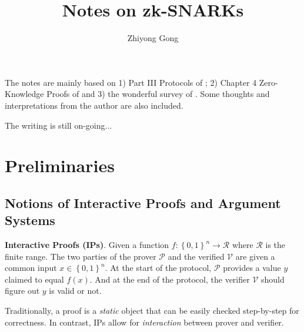 \documentclass{article}
\title{Notes on zk-SNARKs}
\author{Zhiyong Gong}
\begin{document}
\maketitle

\tableofcontents

\clearpage

The notes are mainly based on 1) Part III Protocols of \cite{boneh2020graduate}; 2) Chapter 4 Zero-Knowledge Proofs of \cite{goldreich2005foundations} and 3) the wonderful survey of \cite{ThalerBookZKP}. Some thoughts and interpretations from the author are also included. 

The writing is still on-going...

\newpage

\section{Preliminaries}

\subsection{Notions of Interactive Proofs and Argument Systems}

\textbf{Interactive Proofs (IPs)}. Given a function $f: \left\{ 0, 1 \right\}^n \rightarrow \mathcal{R}$ where $\mathcal{R}$ is the finite range. The two parties of the prover $\mathcal{P}$ and the verified $\mathcal{V}$ are given a common input $x \in \left\{ 0, 1 \right\}^n$. At the start of the protocol, $\mathcal{P}$ provides a value $y$ claimed to equal $f(x)$. And at the end of the protocol, the verifier $\mathcal{V}$ should figure out $y$ is valid or not.

Traditionally, a proof is a \textit{static} object that can be easily checked step-by-step for correctness. In contrast, IPs allow for \textit{interaction} between prover and verifier.
\end{document}
